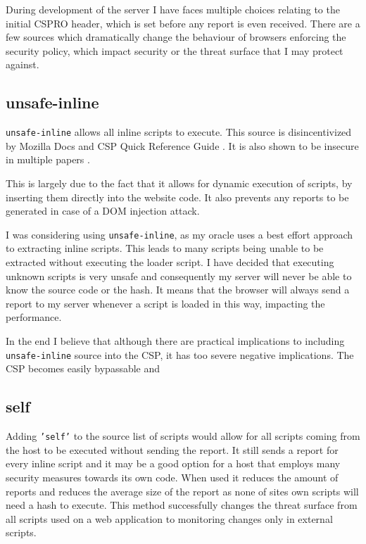 \begin{description}
During development of the server I have faces multiple choices relating to the initial CSPRO header, which is set before any report is even received.
There are a few sources which dramatically change the behaviour of browsers enforcing the security policy, which impact security or the threat surface that I may protect against.

\subsection{unsafe-inline}

\texttt{unsafe-inline} allows all inline scripts to execute. 
This source is disincentivized by Mozilla Docs \cite{unsafeinlinebad2} and CSP Quick Reference Guide \cite{unsafeinlinebad1}.
It is also shown to be insecure in multiple papers \cite{weichselbaum2016csp} \cite{osti_10173479}.

This is largely due to the fact that it allows for dynamic execution of scripts, by inserting them directly into the website code.
It also prevents any reports to be generated in case of a DOM injection attack.

I was considering using \texttt{unsafe-inline}, as my oracle uses a best effort approach to extracting inline scripts.
This leads to many scripts being unable to be extracted without executing the loader script.
I have decided that executing unknown scripts is very unsafe and consequently my server will never be able to know the source code or the hash.
It means that the browser will always send a report to my server whenever a script is loaded in this way, impacting the performance.

In the end I believe that although there are practical implications to including \texttt{unsafe-inline} source into the CSP, it has too severe negative implications.
The CSP becomes easily bypassable and 

\subsection{self}

Adding \texttt{'self'} to the source list of scripts would allow for all scripts coming from the host to be executed without sending the report.
It still sends a report for every inline script and it  may be a good option for a host that employs many security measures towards its own code.
When used it reduces the amount of reports and reduces the average size of the report as none of sites own scripts will need a hash to execute.
This method successfully changes the threat surface from all scripts used on a web application to monitoring changes only in external scripts.


\end{description}
